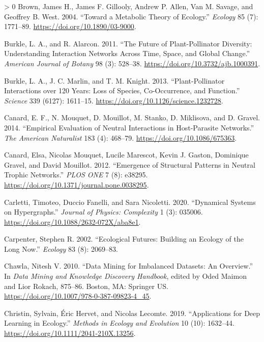 \documentclass[11pt]{article}
\newlength{\cslhangindent}
\newenvironment{CSLReferences}[3] %
 {%
  \setlength{\parindent}{0pt}
  \ifodd #1 \everypar{\setlength{\hangindent}{\cslhangindent}}\ignorespaces\fi
  \ifnum #2 > 0
  \setlength{\parskip}{#2\baselineskip}
  \fi
 }%
 {}
\begin{document}
\begin{CSLReferences}{1}{0}
\leavevmode\hypertarget{ref-Brown2004MetThe}{}%
Brown, James H., James F. Gillooly, Andrew P. Allen, Van M. Savage, and
Geoffrey B. West. 2004. {``Toward a Metabolic Theory of Ecology.''}
\emph{Ecology} 85 (7): 1771--89. \url{https://doi.org/10.1890/03-9000}.

\leavevmode\hypertarget{ref-Burkle2011FutPla}{}%
Burkle, L. A., and R. Alarcon. 2011. {``The Future of Plant-Pollinator
Diversity: Understanding Interaction Networks Across Time, Space, and
Global Change.''} \emph{American Journal of Botany} 98 (3): 528--38.
\url{https://doi.org/10.3732/ajb.1000391}.

\leavevmode\hypertarget{ref-Burkle2013PlaInt}{}%
Burkle, L. A., J. C. Marlin, and T. M. Knight. 2013. {``Plant-Pollinator
Interactions over 120 Years: Loss of Species, Co-Occurrence, and
Function.''} \emph{Science} 339 (6127): 1611--15.
\url{https://doi.org/10.1126/science.1232728}.

\leavevmode\hypertarget{ref-Canard2014EmpEva}{}%
Canard, E. F., N. Mouquet, D. Mouillot, M. Stanko, D. Miklisova, and D.
Gravel. 2014. {``Empirical Evaluation of Neutral Interactions in
Host-Parasite Networks.''} \emph{The American Naturalist} 183 (4):
468--79. \url{https://doi.org/10.1086/675363}.

\leavevmode\hypertarget{ref-Canard2012EmeStr}{}%
Canard, Elsa, Nicolas Mouquet, Lucile Marescot, Kevin J. Gaston,
Dominique Gravel, and David Mouillot. 2012. {``Emergence of Structural
Patterns in Neutral Trophic Networks.''} \emph{PLOS ONE} 7 (8): e38295.
\url{https://doi.org/10.1371/journal.pone.0038295}.

\leavevmode\hypertarget{ref-Carletti2020DynSys}{}%
Carletti, Timoteo, Duccio Fanelli, and Sara Nicoletti. 2020.
{``Dynamical Systems on Hypergraphs.''} \emph{Journal of Physics:
Complexity} 1 (3): 035006.
\url{https://doi.org/10.1088/2632-072X/aba8e1}.

\leavevmode\hypertarget{ref-Carpenter2002EcoFut}{}%
Carpenter, Stephen R. 2002. {``Ecological Futures: Building an Ecology
of the Long Now.''} \emph{Ecology} 83 (8): 2069--83.

\leavevmode\hypertarget{ref-Chawla2010DatMin}{}%
Chawla, Nitesh V. 2010. {``Data Mining for Imbalanced Datasets: An
Overview.''} In \emph{Data Mining and Knowledge Discovery Handbook},
edited by Oded Maimon and Lior Rokach, 875--86. Boston, MA: Springer US.
\url{https://doi.org/10.1007/978-0-387-09823-4_45}.

\leavevmode\hypertarget{ref-Christin2019AppDee}{}%
Christin, Sylvain, Éric Hervet, and Nicolas Lecomte. 2019.
{``Applications for Deep Learning in Ecology.''} \emph{Methods in
Ecology and Evolution} 10 (10): 1632--44.
\url{https://doi.org/10.1111/2041-210X.13256}.


\end{CSLReferences}
\end{document}

